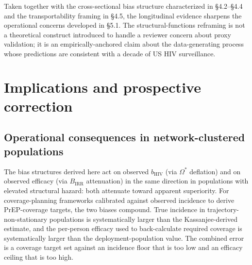 \documentclass[12pt]{article}
\begin{document}
Taken together with the cross-sectional bias structure characterized in §4.2--§4.4 and the transportability framing in §4.5, the longitudinal evidence sharpens the operational concerns developed in §5.1. The structural-functions reframing is not a theoretical construct introduced to handle a reviewer concern about proxy validation; it is an empirically-anchored claim about the data-generating process whose predictions are consistent with a decade of US HIV surveillance.

\section{Implications and prospective correction}

\subsection{Operational consequences in network-clustered populations}

The bias structures derived here act on observed $b_{\mathrm{HIV}}$ (via $\Omega^*$ deflation) and on observed efficacy (via $B_{\mathrm{IRR}}$ attenuation) in the same direction in populations with elevated structural hazard: both attenuate toward apparent superiority. For coverage-planning frameworks calibrated against observed incidence to derive PrEP-coverage targets, the two biases compound. True incidence in trajectory-non-stationary populations is systematically larger than the Kassanjee-derived estimate, and the per-person efficacy used to back-calculate required coverage is systematically larger than the deployment-population value. The combined error is a coverage target set against an incidence floor that is too low and an efficacy ceiling that is too high.
\end{document}
